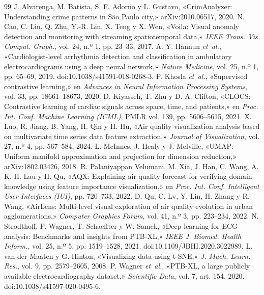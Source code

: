 \documentclass[conference]{IEEEtran}
\begin{document}
\begin{thebibliography}{99}
 J. Alvarenga, M. Batista, S. F. Adorno y L. Gustavo, «CrimAnalyzer: Understanding crime patterns in São Paulo city,» arXiv:2010.06517, 2020.
 N. Cao, C. Lin, Q. Zhu, Y.-R. Lin, X. Teng y X. Wen, «Voila: Visual anomaly detection and monitoring with streaming spatiotemporal data,» \emph{IEEE Trans. Vis. Comput. Graph.}, vol. 24, n.º 1, pp. 23--33, 2017.
 A. Y. Hannun \emph{et~al.}, «Cardiologist-level arrhythmia detection and classification in ambulatory electrocardiograms using a deep neural network,» \emph{Nature Medicine}, vol. 25, n.º 1, pp. 65--69, 2019. doi:10.1038/s41591-018-0268-3.
 P. Khosla \emph{et~al.}, «Supervised contrastive learning,» en \emph{Advances in Neural Information Processing Systems}, vol. 33, pp. 18661--18673, 2020.
 D. Kiyasseh, T. Zhu y D. A. Clifton, «CLOCS: Contrastive learning of cardiac signals across space, time, and patients,» en \emph{Proc. Int. Conf. Machine Learning (ICML)}, PMLR vol. 139, pp. 5606--5615, 2021.
 X. Luo, R. Jiang, B. Yang, H. Qin y H. Hu, «Air quality visualization analysis based on multivariate time series data feature extraction,» \emph{Journal of Visualization}, vol. 27, n.º 4, pp. 567--584, 2024.
 L. McInnes, J. Healy y J. Melville, «UMAP: Uniform manifold approximation and projection for dimension reduction,» arXiv:1802.03426, 2018.
 R. Palaniyappan Velumani, M. Xia, J. Han, C. Wang, A. K. H. Lau y H. Qu, «AQX: Explaining air quality forecast for verifying domain knowledge using feature importance visualization,» en \emph{Proc. Int. Conf. Intelligent User Interfaces (IUI)}, pp. 720--733, 2022.
 D. Qu, C. Lv, Y. Lin, H. Zhang y R. Wang, «AirLens: Multi-level visual exploration of air quality evolution in urban agglomerations,» \emph{Computer Graphics Forum}, vol. 41, n.º 3, pp. 223--234, 2022.
 N. Strodthoff, P. Wagner, T. Schaeffter y W. Samek, «Deep learning for ECG analysis: Benchmarks and insights from PTB-XL,» \emph{IEEE J. Biomed. Health Inform.}, vol. 25, n.º 5, pp. 1519--1528, 2021. doi:10.1109/JBHI.2020.3022989.
 L. van der Maaten y G. Hinton, «Visualizing data using t-SNE,» \emph{J. Mach. Learn. Res.}, vol. 9, pp. 2579--2605, 2008.
 P. Wagner \emph{et~al.}, «PTB-XL, a large publicly available electrocardiography dataset,» \emph{Scientific Data}, vol. 7, art. 154, 2020. doi:10.1038/s41597-020-0495-6.
\end{thebibliography}
\end{document}
